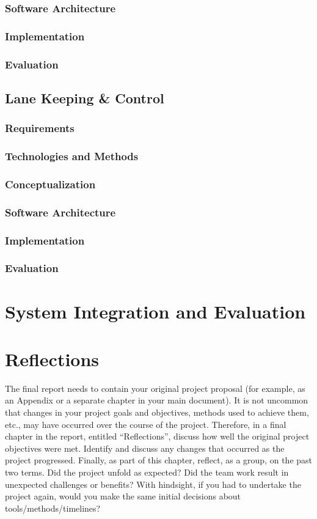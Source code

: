 \documentclass[titlepage]{article}
\begin{document}
\subsubsection{Software Architecture}
\subsubsection{Implementation}
\subsubsection{Evaluation}

\subsection{Lane Keeping \& Control}
\subsubsection{Requirements}
\subsubsection{Technologies and Methods}
\subsubsection{Conceptualization}
\subsubsection{Software Architecture}
\subsubsection{Implementation}
\subsubsection{Evaluation}


\section{System Integration and Evaluation}

\section{Reflections}

The final report needs to contain your original project proposal 
(for example, as an Appendix or a separate chapter in your main 
document). It is not uncommon that changes in your project goals 
and objectives, methods used to achieve them, etc., may have 
occurred over the course of the project. Therefore, in a final 
chapter in the report, entitled “Reflections”, discuss how well 
the original project objectives were met. Identify and discuss any
changes that occurred as the project progressed. Finally, as part 
of this chapter, reflect, as a group, on the past two terms. Did 
the project unfold as expected? Did the team work result in unexpected 
challenges or benefits? With hindsight, if you had to undertake the 
project again, would you make the same initial decisions about 
tools/methods/timelines?
\end{document}
